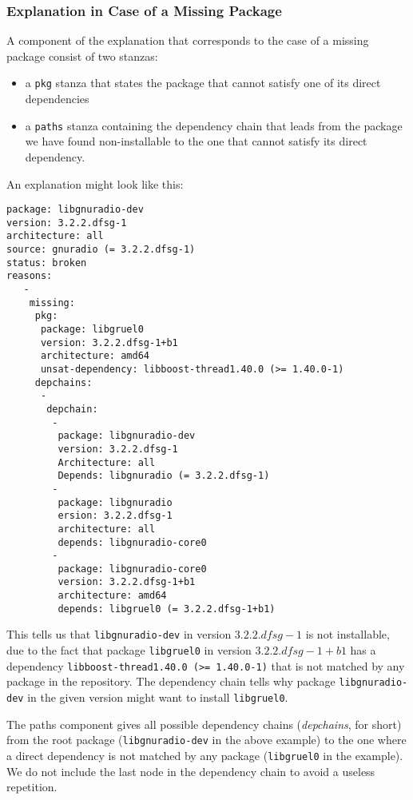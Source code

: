 \subsubsection{Explanation in Case of a Missing Package}
A component of the explanation that corresponds to the case of a
missing package consist of two stanzas:
\begin{itemize}
\item a \texttt{pkg} stanza that states the package that cannot satisfy
  one of its direct dependencies
\item a \texttt{paths} stanza containing the dependency chain that
  leads from the package we have found non-installable to the one that
  cannot satisfy its direct dependency.
\end{itemize}
\begin{example}
An explanation might look like this:
\begin{verbatim}
package: libgnuradio-dev
version: 3.2.2.dfsg-1
architecture: all
source: gnuradio (= 3.2.2.dfsg-1)
status: broken
reasons:
   -
    missing:
     pkg:
      package: libgruel0
      version: 3.2.2.dfsg-1+b1
      architecture: amd64
      unsat-dependency: libboost-thread1.40.0 (>= 1.40.0-1)
     depchains:
      -
       depchain:
        -
         package: libgnuradio-dev
         version: 3.2.2.dfsg-1
         Architecture: all
         Depends: libgnuradio (= 3.2.2.dfsg-1)
        -
         package: libgnuradio
         ersion: 3.2.2.dfsg-1
         architecture: all
         depends: libgnuradio-core0
        -
         package: libgnuradio-core0
         version: 3.2.2.dfsg-1+b1
         architecture: amd64
         depends: libgruel0 (= 3.2.2.dfsg-1+b1)
\end{verbatim}
This tells us that \texttt{libgnuradio-dev} in version $3.2.2.dfsg-1$
is not installable, due to the fact that package \texttt{libgruel0}
in version $3.2.2.dfsg-1+b1$ has a dependency
\texttt{libboost-thread1.40.0 (>= 1.40.0-1)} that is not matched by
any package in the repository. The dependency chain tells why package
\texttt{libgnuradio-dev} in the given version might want to install
\texttt{libgruel0}.
\end{example}

The paths component gives all possible dependency chains (\textit{depchains}, for short) from the root package
(\texttt{libgnuradio-dev} in the above example) to the one where a
direct dependency is not matched by any package (\texttt{libgruel0} in
the example). We do not include the last node in the dependency chain
to avoid a useless repetition.

